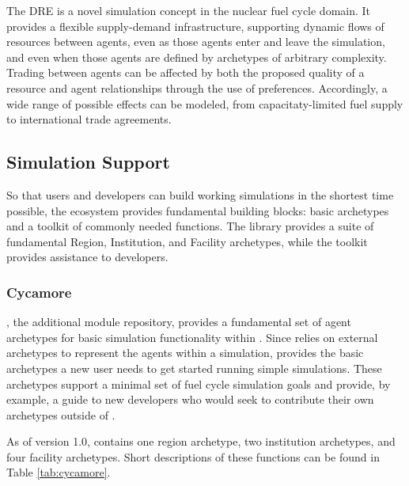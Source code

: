 The \gls{DRE} is a novel simulation concept in the nuclear fuel cycle domain. It
provides a flexible supply-demand infrastructure, supporting dynamic flows of
resources between agents, even as those agents enter and leave the simulation, and
even when those agents are defined by archetypes of arbitrary complexity. Trading
between agents can be affected by both the
proposed quality of a resource and agent relationships through the use of
preferences. Accordingly, a wide range of possible effects can be
modeled, from capacitaty-limited fuel supply to international trade agreements.

\subsection{Simulation Support}
So that users and developers can build working simulations in the shortest time
possible, the \Cyclus ecosystem provides fundamental building blocks: basic
archetypes and a toolkit of commonly needed functions.  The \Cycamore library
provides a suite of fundamental Region, Institution, and Facility archetypes,
while the \Cyclus toolkit provides assistance to developers.

\subsubsection{Cycamore}

\Cycamore \cite{carlsen_cycamore_2014}, the \Cyclus additional module
repository, provides a fundamental set of agent archetypes for basic simulation
functionality within \Cyclus.  Since \Cyclus relies on external
archetypes to represent the agents within a simulation, \Cycamore provides the
basic archetypes a new user needs to get started running simple simulations.
These archetypes support a minimal set of fuel cycle simulation goals and
provide, by example, a guide to new developers who would seek to contribute
their own archetypes outside of \Cycamore.

As of version 1.0, \Cycamore contains one region archetype, two institution
archetypes, and four facility archetypes. Short descriptions of these functions
can be found in Table \ref{tab:cycamore}.


